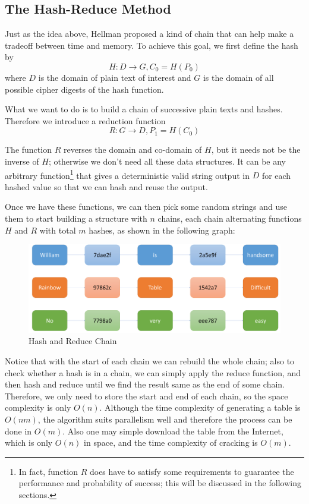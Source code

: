 \documentclass{article}
\begin{document}
\begin{multicols}{2}
\subsection{The Hash-Reduce Method}
Just as the idea above, Hellman\cite{hellman1980cryptanalytic} proposed a kind of chain that can help make a tradeoff between time and memory. To achieve this goal, we first define the hash by $$H:D\to G, C_0=H(P_0)$$
where $D$ is the domain of plain text of interest and $G$ is the domain of all possible cipher digests of the hash function. 

What we want to do is to build a chain of successive plain texts and hashes. Therefore we introduce a reduction function $$R:G\to D, P_1 = H(C_0)$$

The function $R$ reverses the domain and co-domain of $H$, but it needs not be the inverse of $H$; otherwise we don't need all these data structures. It can be any arbitrary function\footnote{In fact, function $R$ does have to satisfy some requirements to guarantee the performance and probability of success; this will be discussed in the following sections.} that gives a deterministic valid string output in $D$ for each hashed value so that we can hash and reuse the output.

Once we have these functions, we can then pick some random strings and use them to start building a structure with $n$ chains, each chain alternating functions $H$ and $R$ with total $m$ hashes, as shown in the following graph:

\begin{figure}[H]
	\centering
	\includegraphics[width=\linewidth]{img/hashReduce}
	\caption{Hash and Reduce Chain}
	\label{fig:hashReduce}
\end{figure}

Notice that with the start of each chain we can rebuild the whole chain; also to check whether a hash is in a chain, we can simply apply the reduce function, and then hash and reduce until we find the result same as the end of some chain. Therefore, we only need to store the start and end of each chain, so the space complexity is only $O(n)$. Although the time complexity of generating a table is $O(nm)$, the algorithm suits parallelism well and therefore the process can be done in $O(m)$. Also one may simple download the table from the Internet, which is only $O(n)$ in space, and the time complexity of cracking is $O(m)$.


\end{multicols}
\end{document}
